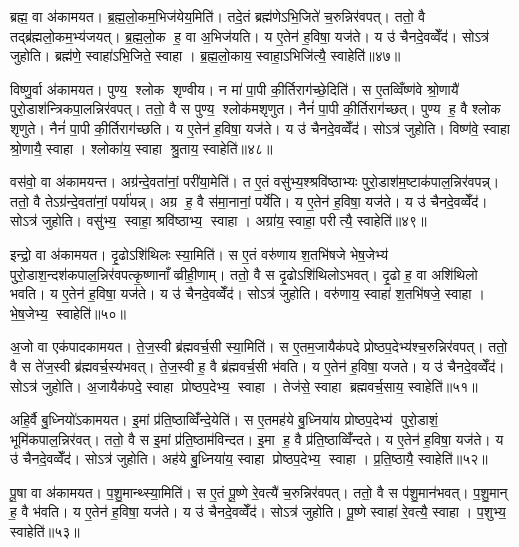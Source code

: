 ब्रह्म॒ वा अ॑कामयत। ब्र॒ह्म॒लो॒कम॒भिज॑येय॒मिति॑। तदे॒तं ब्रह्म॑णेऽभि॒जिते॑ च॒रुन्निर॑वपत्। ततो॒ वै तद्ब्र॑ह्मलो॒कम॒भ्य॑जयत्। ब्र॒ह्म॒लो॒क ह॒ वा अ॒भिज॑यति। य ए॒तेन॑ ह॒विषा॒ यज॑ते। य उ॑ चैनदे॒वव्वेँद॑। सोऽत्र॑ जुहोति। ब्रह्म॑णे॒ स्वाहा॑ऽभि॒जिते॒ स्वाहा। ब्र॒ह्म॒लो॒काय॒ स्वाहा॒ऽभिजि॑त्यै॒ स्वाहेति॑॥४७॥

विष्णु॒र्वा अ॑कामयत। पुण्य॒ श्लोक शृण्वीय। न मा॑ पा॒पी की॒र्तिराग॑च्छे॒दिति॑। स ए॒तव्विँष्ण॑वे श्रो॒णायै॑ पुरो॒डाश॑न्त्रिकपा॒लन्निर॑वपत्। ततो॒ वै स पुण्य॒ श्लोक॑मशृणुत। नैनं॑ पा॒पी की॒र्तिराग॑च्छत्। पुण्य ह॒ वै श्लोक शृणुते। नैनं॑ पा॒पी की॒र्तिराग॑च्छति। य ए॒तेन॑ ह॒विषा॒ यज॑ते। य उ॑ चैनदे॒वव्वेँद॑। सोऽत्र॑ जुहोति। विष्ण॑वे॒ स्वाहा श्रो॒णायै॒ स्वाहा। श्लोका॑य॒ स्वाहा श्रु॒ताय॒ स्वाहेति॑॥४८॥

वस॑वो॒ वा अ॑कामयन्त। अग्र॑न्दे॒वता॑नां॒ परी॑या॒मेति॑। त ए॒तं वसु॑भ्य॒श्श्रवि॑ष्ठाभ्यः पुरो॒डाश॑म॒ष्टाक॑पाल॒न्निर॑वपन्न्। ततो॒ वै तेऽग्र॑न्दे॒वता॑नां॒ पर्या॑यन्न्। अग्र ह॒ वै स॑मा॒नानां॒ पर्ये॑ति। य ए॒तेन॑ ह॒विषा॒ यज॑ते। य उ॑ चैनदे॒वव्वेँद॑। सोऽत्र॑ जुहोति। वसु॑भ्य॒ स्वाहा॒ श्रवि॑ष्ठाभ्य॒ स्वाहा। अग्रा॑य॒ स्वाहा॒ परीत्यै॒ स्वाहेति॑॥४९॥

इन्द्रो॒ वा अ॑कामयत। दृ॒ढोऽशि॑थिलः स्या॒मिति॑। स ए॒तं वरु॑णाय श॒तभि॑षजे भेष॒जेभ्य॑ पुरो॒डाश॒न्दश॑कपाल॒न्निर॑वपत्कृ॒ष्णानाँव्व्रीही॒णाम्। ततो॒ वै स दृ॒ढोऽशि॑थिलोऽभवत्। दृ॒ढो ह॒ वा अशि॑थिलो भवति। य ए॒तेन॑ ह॒विषा॒ यज॑ते। य उ॑ चैनदे॒वव्वेँद॑। सोऽत्र॑ जुहोति। वरु॑णाय॒ स्वाहा॑ श॒तभि॑षजे॒ स्वाहा। भे॒ष॒जेभ्य॒ स्वाहेति॑॥५०॥

अ॒जो वा एक॑पादकामयत। ते॒ज॒स्वी ब्र॑ह्मवर्च॒सी स्या॒मिति॑। स ए॒तम॒जायैक॑पदे प्रोष्ठप॒देभ्य॑श्च॒रुन्निर॑वपत्। ततो॒ वै स ते॑ज॒स्वी ब्र॑ह्मवर्च॒स्य॑भवत्। ते॒ज॒स्वी ह॒ वै ब्र॑ह्मवर्च॒सी भ॑वति। य ए॒तेन॑ ह॒विषा॒ यजते। य उ॑ चैनदे॒वव्वेँद॑। सोऽत्र॑ जुहोति। अ॒जायैक॑पदे॒ स्वाहा प्रोष्ठप॒देभ्य॒ स्वाहा। तेज॑से॒ स्वाहा ब्रह्मवर्च॒साय॒ स्वाहेति॑॥५१॥

अहि॒र्वै बु॒ध्नियो॑ऽकामयत। इ॒मां प्र॑ति॒ष्ठाव्विँ॑न्दे॒येति॑। स ए॒तमह॑ये बु॒ध्निया॑य प्रोष्ठप॒देभ्य॑ पुरो॒डाशं॒ भूमि॑कपाल॒न्निर॑वत्। ततो॒ वै स इ॒मां प्र॑ति॒ष्ठाम॑विन्दत। इ॒मा ह॒ वै प्र॑ति॒ष्ठाव्विँ॑न्दते। य ए॒तेन॑ ह॒विषा॒ यज॑ते। य उ॑ चैनदे॒वव्वेँद॑। सोऽत्र॑ जुहोति। अह॑ये बु॒ध्निया॑य॒ स्वाहा प्रोष्ठप॒देभ्य॒ स्वाहा। प्र॒ति॒ष्ठायै॒ स्वाहेति॑॥५२॥

पू॒षा वा अ॑कामयत। प॒शु॒मान्थ्स्या॒मिति॑। स ए॒तं पू॒ष्णे रे॒वत्यै॑ च॒रुन्निर॑वपत्। ततो॒ वै स प॑शु॒मान॑भवत्। प॒शु॒मान् ह॒ वै भ॑वति। य ए॒तेन॑ ह॒विषा॒ यज॑ते। य उ॑ चैनदे॒वव्वेँद॑। सोऽत्र॑ जुहोति। पू॒ष्णे स्वाहा॑ रे॒वत्यै॒ स्वाहा। प॒शुभ्य॒ स्वाहेति॑॥५३॥

